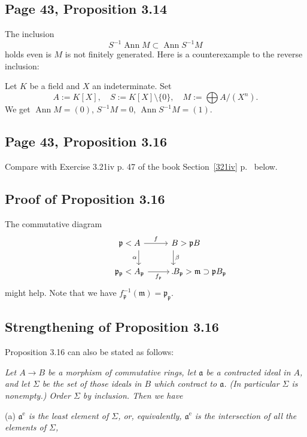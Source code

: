 \documentclass[parskip=half,fontsize=12pt]{scrartcl}%
\newcommand{\oo}{\operatorname}\newcommand{\ooo}{\operatorname*}
\newcommand{\mf}{\mathfrak}
\newcommand{\aaa}{\mf a}
\newcommand{\ppp}{\mf p}
\begin{document}
\subsection{Page 43, Proposition 3.14}%

The inclusion 
$$
S^{-1}\oo{Ann}M\subset\oo{Ann}S^{-1}M
$$ 
holds even is $M$ is not finitely generated. Here is a counterexample to the reverse inclusion:

Let $K$ be a field and $X$ an indeterminate. Set 
$$
A:=K[X],\quad S:=K[X]\setminus\{0\},\quad M:=\bigoplus A/(X^n).
$$ 
We get $\oo{Ann}M=(0)$, $S^{-1}M=0$, $\oo{Ann}S^{-1}M=(1)$. 

\subsection{Page 43, Proposition 3.16}%

Compare with Exercise 3.21iv p. 47 of the book Section~\ref{321iv} p.~\pageref{321iv} below.

\subsection{Proof of Proposition 3.16}

The commutative diagram
$$
\begin{tikzcd}
\kern-22pt\ppp<A\ar[d,"\alpha"']\ar[r,"f"]&B>\ppp B\ar[d,"\beta"]\kern-30pt\\ 
\kern-22pt\ppp_\ppp<A_\ppp\ar[r,"f_\ppp"']&B_\ppp>\mf m\supset\ppp B_\ppp\kern-66pt.
\end{tikzcd}
$$ 
might help. Note that we have $f_\ppp^{-1}(\mf m)=\ppp_\ppp$.


\subsection{Strengthening of Proposition 3.16}\label{43}

Proposition 3.16 can also be stated as follows:

\emph{Let $A\to B$ be a morphism of commutative rings, let $\aaa$ be a contracted ideal in $A$, and let $\Sigma$ be the set of those ideals in $B$ which contract to $\aaa$. (In particular $\Sigma$ is nonempty.) Order $\Sigma$ by inclusion. Then we have}

(a) \emph{$\aaa^{\oo e}$ is the least element of $\Sigma$, or, equivalently, $\aaa^{\oo e}$ is the intersection of all the elements of $\Sigma$,}
\end{document}
